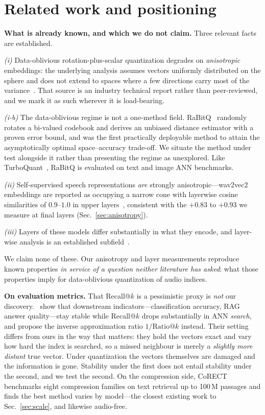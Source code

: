 \documentclass[conference]{IEEEtran}
\begin{document}
\section{Related work and positioning}
\label{sec:related}

\textbf{What is already known, and which we do not claim.} Three relevant facts are established.

\emph{(i)} Data-oblivious rotation-plus-scalar quantization degrades on \emph{anisotropic}
embeddings: the underlying analysis assumes vectors uniformly distributed on the sphere and does
not extend to spaces where a few directions carry most of the variance~\cite{qdrant2025}. That
source is an industry technical report rather than peer-reviewed, and we mark it as such wherever
it is load-bearing.

\emph{(i-b)} The data-oblivious regime is not a one-method field. RaBitQ~\cite{gao2024} randomly
rotates a bi-valued codebook and derives an unbiased distance estimator with a proven error bound,
and was the first practically deployable method to attain the asymptotically optimal
space--accuracy trade-off. We situate the method under test alongside it rather than presenting the
regime as unexplored. Like TurboQuant~\cite{zandieh2025}, RaBitQ is evaluated on text and image ANN
benchmarks.

\emph{(ii)} Self-supervised speech representations \emph{are} strongly anisotropic---wav2vec2
embeddings are reported as occupying a narrow cone with layerwise cosine similarities of
$0.9$--$1.0$ in upper layers~\cite{liu2024,anisotropy2026}, consistent with the $+0.83$ to $+0.93$
we measure at final layers (Sec.~\ref{sec:anisotropy}).

\emph{(iii)} Layers of these models differ substantially in what they encode, and layer-wise
analysis is an established subfield~\cite{pasad2021,pasad2023}.

We claim none of these. Our anisotropy and layer measurements reproduce known properties
\emph{in service of a question neither literature has asked}: what those properties imply for
data-oblivious quantization of audio indices.

\textbf{On evaluation metrics.} That Recall@$k$ is a pessimistic proxy is \emph{not} our
discovery.~\cite{dimitropoulos2026} show that downstream indicators---classification accuracy, RAG
answer quality---stay stable while Recall@$k$ drops substantially in ANN \emph{search}, and propose
the inverse approximation ratio $1/\mathrm{Ratio}@k$ instead. Their setting differs from ours in
the way that matters: they hold the vectors exact and vary how hard the index is searched, so a
missed neighbour is merely a \emph{slightly more distant} true vector. Under quantization the
vectors themselves are damaged and the information is gone. Stability under the first does not
entail stability under the second, and we test the second. On the compression side,
CoRECT~\cite{corect2025} benchmarks eight compression families on text retrieval up to 100\,M
passages and finds the best method varies by model---the closest existing work to
Sec.~\ref{sec:scale}, and likewise audio-free.
\end{document}
